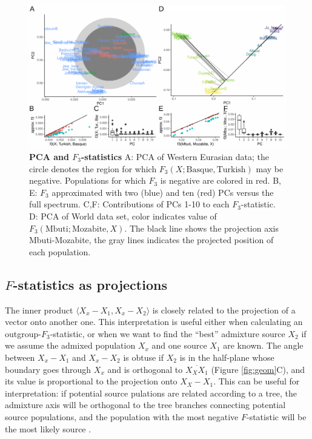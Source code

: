 \documentclass[12pt,fullpage, a4paper]{article}
\begin{document}
\begin{figure}[!ht]
	\includegraphics[width=\textwidth]{figures/fig_f3_data.pdf}
	\caption{\textbf{PCA and $F_3$-statistics} A: PCA of Western Eurasian data; the circle denotes the region for which $F_3(X; \text{Basque}, \text{Turkish})$ may be negative. Populations for which $F_3$ is negative are colored in red. B, E: $F_3$ approximated with two (blue) and ten (red) PCs versus the full spectrum. C,F: Contributions of PCs 1-10 to each $F_3$-statistic. D: PCA of World data set, color indicates value of $F_3(\text{Mbuti}; \text{Mozabite}, X)$. The black line shows the projection axis Mbuti-Mozabite, the gray lines indicates the projected position of each population. }
	\label{fig:f3}
\end{figure}

\subsection{$F$-statistics as projections}
The inner product $\langle X_x - X_1, X_x - X_2 \rangle$ is closely related to the projection of a vector onto another one. This interpretation is useful either when calculating an outgroup-$F_3$-statistic, or when we want to find the ``best'' admixture source $X_2$ if we assume the admixed population $X_x$ and one source $X_1$ are known.  The angle between $X_x - X_1$ and $X_x - X_2$ is obtuse if $X_2$ is in the half-plane whose boundary goes through $X_x$ and is orthogonal to $\overline{X_XX_1}$ (Figure \ref{fig:geom}C), and its value is proportional to the projection onto $X_X - X_1$. This can be useful for interpretation: if potential source pulations are related according to a tree, the admixture axis will be orthogonal to the tree branches connecting potential source populations, and the population with the most negative $F$-statistic will be the most likely source \citep{patterson2012}. 
\end{document}
